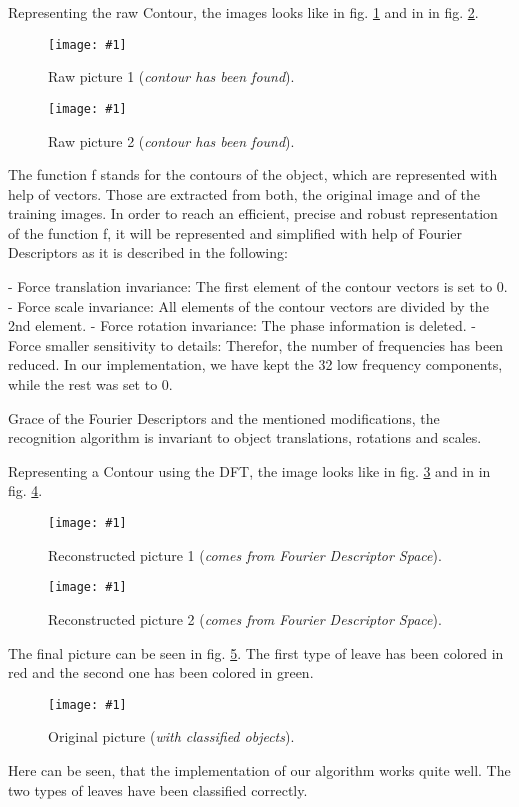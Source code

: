 \documentclass[a4paper,headings=small]{scrartcl}
\numberwithin{equation}{section} %
\numberwithin{figure}{section}   %
\newcommand{\image}[3]{
	\begin{figure}[htbp]
		\centering
		\texttt{[image: \#1]}
		\caption{#3}
		\label{fig:#1}
	\end{figure}
}
\begin{document}
Representing the raw Contour, the images looks like in fig. \ref{fig:../../../target/pic_RawFourierDescriptor1} 
and in in fig. \ref{fig:../../../target/pic_RawFourierDescriptor2}.

\image{../../../target/pic_RawFourierDescriptor1}{0.2}{%
		Raw picture 1 (\emph{contour has been found}).}
\image{../../../target/pic_RawFourierDescriptor2}{0.5}{%
		Raw picture 2 (\emph{contour has been found}).}
\newpage
The function f stands for the contours of the object, which are represented with help of vectors.
Those are extracted from both, the original image and of the training images.
In order to reach an efficient, precise and robust representation of the function f, 
it will be represented and simplified with help of Fourier Descriptors as it is described in the following:

- Force translation invariance: The first element of the contour vectors is set to 0.\newline
- Force scale invariance:  All elements of the contour vectors are divided by the 2nd element. \newline
- Force rotation invariance: The phase information is deleted. \newline
- Force smaller sensitivity to details: Therefor, the number of frequencies has been reduced.
In our implementation, we have kept the 32 low frequency components, while the rest was set to 0.

Grace of the Fourier Descriptors and the mentioned modifications, 
the recognition algorithm is invariant to object translations,
rotations and scales.

Representing a Contour using the DFT, the image looks like in fig. \ref{fig:../../../target/pic_FourierDescriptor1} 
and in in fig. \ref{fig:../../../target/pic_FourierDescriptor2}.

\image{../../../target/pic_FourierDescriptor1}{0.3}{%
		Reconstructed picture 1 (\emph{comes from Fourier Descriptor Space}).}
\image{../../../target/pic_FourierDescriptor2}{0.5}{%
		Reconstructed picture 2 (\emph{comes from Fourier Descriptor Space}).}

The final picture can be seen in fig. \ref{fig:../../../target/pic_final}.
The first type of leave has been colored in red 
and the second one has been colored in green.

\image{../../../target/pic_final}{0.5}{%
		Original picture (\emph{with classified objects}).} 

Here can be seen, that the implementation of our algorithm works quite well.
The two types of leaves have been classified correctly.
\end{document}
